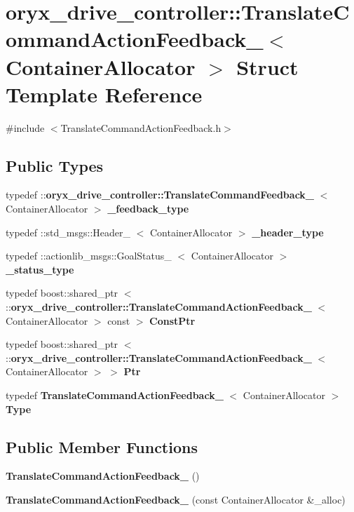 \section{oryx\-\_\-drive\-\_\-controller\-:\-:\-Translate\-Command\-Action\-Feedback\-\_\-$<$ \-Container\-Allocator $>$ \-Struct \-Template \-Reference}
\label{structoryx__drive__controller_1_1TranslateCommandActionFeedback__}


{\ttfamily \#include $<$\-Translate\-Command\-Action\-Feedback.\-h$>$}

\subsection*{\-Public \-Types}
\begin{DoxyCompactItemize}
\item 
typedef \*
\-::{\bf oryx\-\_\-drive\-\_\-controller\-::\-Translate\-Command\-Feedback\-\_\-}\*
$<$ \-Container\-Allocator $>$ {\bf \-\_\-feedback\-\_\-type}
\item 
typedef \-::std\-\_\-msgs\-::\-Header\-\_\-\*
$<$ \-Container\-Allocator $>$ {\bf \-\_\-header\-\_\-type}
\item 
typedef \*
\-::actionlib\-\_\-msgs\-::\-Goal\-Status\-\_\-\*
$<$ \-Container\-Allocator $>$ {\bf \-\_\-status\-\_\-type}
\item 
typedef boost\-::shared\-\_\-ptr\*
$<$ \-::{\bf oryx\-\_\-drive\-\_\-controller\-::\-Translate\-Command\-Action\-Feedback\-\_\-}\*
$<$ \-Container\-Allocator $>$ const  $>$ {\bf \-Const\-Ptr}
\item 
typedef boost\-::shared\-\_\-ptr\*
$<$ \-::{\bf oryx\-\_\-drive\-\_\-controller\-::\-Translate\-Command\-Action\-Feedback\-\_\-}\*
$<$ \-Container\-Allocator $>$ $>$ {\bf \-Ptr}
\item 
typedef \*
{\bf \-Translate\-Command\-Action\-Feedback\-\_\-}\*
$<$ \-Container\-Allocator $>$ {\bf \-Type}
\end{DoxyCompactItemize}
\subsection*{\-Public \-Member \-Functions}
\begin{DoxyCompactItemize}
\item 
{\bf \-Translate\-Command\-Action\-Feedback\-\_\-} ()
\item 
{\bf \-Translate\-Command\-Action\-Feedback\-\_\-} (const \-Container\-Allocator \&\-\_\-alloc)
\end{DoxyCompactItemize}
